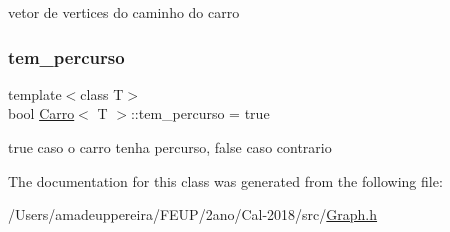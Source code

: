 vetor de vertices do caminho do carro \mbox{\label{class_carro_a6d26498b0d2bbe5729f2ba0464d873cb}} 
\subsubsection{\texorpdfstring{tem\+\_\+percurso}{tem\_percurso}}
{\footnotesize\ttfamily template$<$class T$>$ \\
bool \mbox{\hyperlink{class_carro}{Carro}}$<$ T $>$\+::tem\+\_\+percurso = true\hspace{0.3cm}{\ttfamily [private]}}

true caso o carro tenha percurso, false caso contrario 

The documentation for this class was generated from the following file\+:\begin{DoxyCompactItemize}
\item 
/\+Users/amadeuppereira/\+F\+E\+U\+P/2ano/\+Cal-\/2018/src/\mbox{\hyperlink{_graph_8h}{Graph.\+h}}\end{DoxyCompactItemize}
